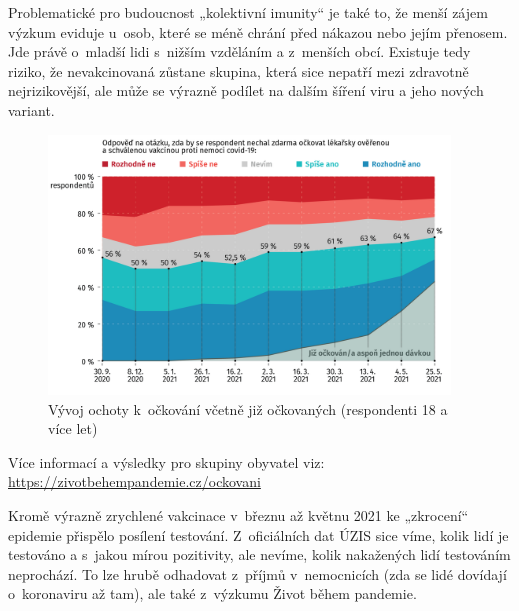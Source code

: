 Problematické pro budoucnost „kolektivní imunity“ je také to, že menší zájem výzkum eviduje u~osob, které se méně chrání před nákazou nebo jejím přenosem. Jde právě o~mladší lidi s nižším vzděláním a z menších obcí. Existuje tedy riziko, že nevakcinovaná zůstane skupina, která sice nepatří mezi zdravotně nejrizikovější, ale může se výrazně podílet na dalším šíření viru a jeho nových variant.

\begin{figure}[ht]
    \centering
    \includegraphics[width=0.95\textwidth]{./pic/zbp-graf6.png}
    \caption{Vývoj ochoty k očkování včetně již očkovaných (respondenti 18 a více let)}
    \label{fig:zbp6}
\end{figure}

Více informací a výsledky pro skupiny obyvatel viz: \url{https://zivotbehempandemie.cz/ockovani}

Kromě výrazně zrychlené vakcinace v březnu až květnu 2021 ke „zkrocení“ epidemie přispělo posílení testování. Z oficiálních dat ÚZIS sice víme, kolik lidí je testováno a s jakou mírou pozitivity, ale nevíme, kolik nakažených lidí testováním neprochází. To lze hrubě odhadovat z příjmů v nemocnicích (zda se lidé dovídají o~koronaviru až tam), ale také z výzkumu Život během pandemie. 

